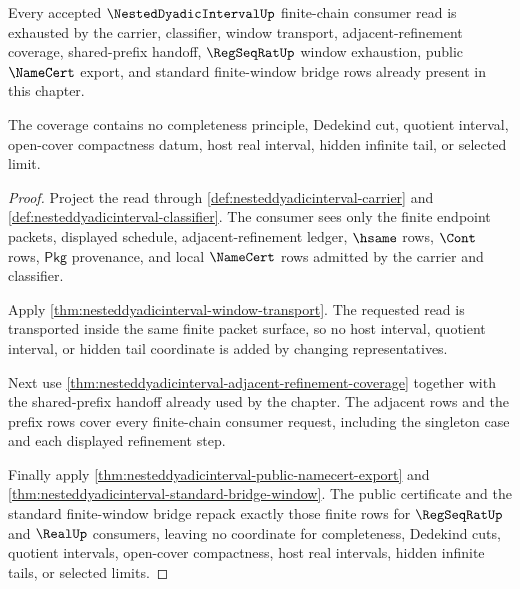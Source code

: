\begin{theorem}
\label{thm:nesteddyadicinterval-mature-window-coverage}
Every accepted $\NestedDyadicIntervalUp$ finite-chain consumer read is exhausted
by the carrier, classifier, window transport, adjacent-refinement coverage,
shared-prefix handoff, $\RegSeqRatUp$ window exhaustion, public $\NameCert$
export, and standard finite-window bridge rows already present in this chapter.

The coverage contains no completeness principle, Dedekind cut, quotient
interval, open-cover compactness datum, host real interval, hidden infinite tail,
or selected limit.
\end{theorem}
\begin{proof}
Project the read through \autoref{def:nesteddyadicinterval-carrier} and
\autoref{def:nesteddyadicinterval-classifier}. The consumer sees only the finite
endpoint packets, displayed schedule, adjacent-refinement ledger, $\hsame$ rows,
$\Cont$ rows, $\mathsf{Pkg}$ provenance, and local $\NameCert$ rows admitted by
the carrier and classifier.

Apply \autoref{thm:nesteddyadicinterval-window-transport}. The requested read is
transported inside the same finite packet surface, so no host interval, quotient
interval, or hidden tail coordinate is added by changing representatives.

Next use \autoref{thm:nesteddyadicinterval-adjacent-refinement-coverage} together
with the shared-prefix handoff already used by the chapter. The adjacent rows and
the prefix rows cover every finite-chain consumer request, including the
singleton case and each displayed refinement step.

Finally apply
\autoref{thm:nesteddyadicinterval-public-namecert-export} and
\autoref{thm:nesteddyadicinterval-standard-bridge-window}. The public certificate
and the standard finite-window bridge repack exactly those finite rows for
$\RegSeqRatUp$ and $\RealUp$ consumers, leaving no coordinate for completeness,
Dedekind cuts, quotient intervals, open-cover compactness, host real intervals,
hidden infinite tails, or selected limits.
\end{proof}


